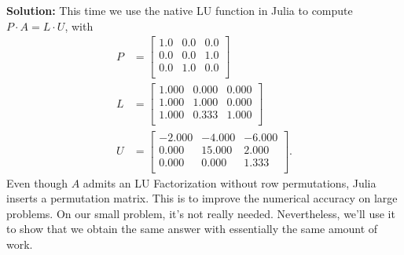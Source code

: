 \textbf{Solution:} This time we use the native LU function in Julia to compute $P \cdot A = L \cdot U$, with
\begin{equation}
    \label{eq:Chap5pt4LUwithPerm}
    \begin{aligned}
        P&= \left[
\begin{array}{ccc}
1.0 & 0.0 & 0.0 \\
0.0 & 0.0 & 1.0 \\
0.0 & 1.0 & 0.0 \\
\end{array}
\right]\\
L&= \left[ \begin{array}{ccc}
1.000 & 0.000 & 0.000 \\
1.000 & 1.000 & 0.000 \\
1.000 & 0.333 & 1.000 \\
\end{array}
\right]\\
U&= 
\left[
\begin{array}{rrr}
-2.000 & -4.000 & -6.000 \\
0.000 & 15.000 & 2.000 \\
0.000 & 0.000 & 1.333 \\
\end{array}
\right].
 \end{aligned}
\end{equation}
Even though $A$ admits an LU Factorization without row permutations, Julia inserts a permutation matrix. This is to improve the numerical accuracy on large problems. On our small problem, it's not really needed. Nevertheless, we'll use it to show that we obtain the same answer with essentially the same amount of work.\\

